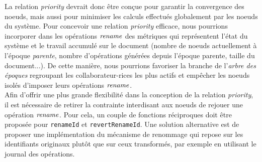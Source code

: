 La relation \emph{priority} devrait donc être conçue pour garantir la convergence des noeuds, mais aussi pour minimiser les calculs effectués globalement par les noeuds du système.
Pour concevoir une relation \emph{priority} efficace, nous pourrions incorporer dans les opérations $\mathit{rename}$ des métriques qui représentent l'état du système et le travail accumulé sur le document (nombre de noeuds actuellement à l'époque \emph{parente}, nombre d'opérations générées depuis l'époque parente, taille du document...).
De cette manière, nous pourrions favoriser la branche de l'\emph{arbre des époques} regroupant les collaborateur-rices les plus actifs et empêcher les noeuds isolés d'imposer leurs opérations $\mathit{rename}$.\\

Afin d'offrir une plus grande flexibilité dans la conception de la relation \emph{priority}, il est nécessaire de retirer la contrainte interdisant aux noeuds de rejouer une opération $\mathit{rename}$.
Pour cela, un couple de fonctions réciproques doit être proposée pour \texttt{renameId} et \texttt{revertRenameId}.
Une solution alternative est de proposer une implémentation du mécanisme de renommage qui repose sur les identifiants originaux plutôt que sur ceux transformés, par exemple en utilisant le journal des opérations.
